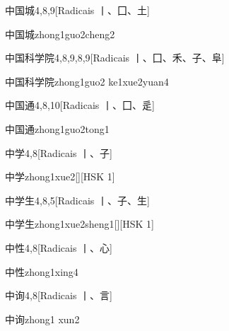 \begin{entry}{中国城}{4,8,9}[Radicais ⼁、⼞、⼟]
  \begin{phonetics}{中国城}{zhong1guo2cheng2}
  \end{phonetics}
\end{entry}

\begin{entry}{中国科学院}{4,8,9,8,9}[Radicais ⼁、⼞、⽲、⼦、⾩]
  \begin{phonetics}{中国科学院}{zhong1guo2 ke1xue2yuan4}
  \end{phonetics}
\end{entry}

\begin{entry}{中国通}{4,8,10}[Radicais ⼁、⼞、⾡]
  \begin{phonetics}{中国通}{zhong1guo2tong1}
  \end{phonetics}
\end{entry}

\begin{entry}{中学}{4,8}[Radicais ⼁、⼦]
  \begin{phonetics}{中学}{zhong1xue2}[][HSK 1]
  \end{phonetics}
\end{entry}

\begin{entry}{中学生}{4,8,5}[Radicais ⼁、⼦、⽣]
  \begin{phonetics}{中学生}{zhong1xue2sheng1}[][HSK 1]
  \end{phonetics}
\end{entry}

\begin{entry}{中性}{4,8}[Radicais ⼁、⼼]
  \begin{phonetics}{中性}{zhong1xing4}
  \end{phonetics}
\end{entry}

\begin{entry}{中询}{4,8}[Radicais ⼁、⾔]
  \begin{phonetics}{中询}{zhong1 xun2}
  \end{phonetics}
\end{entry}

